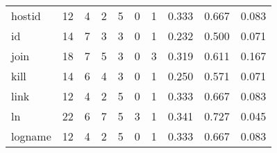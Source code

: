 \begin{longtable}{lp{1.3cm}p{1.3cm}p{1.3cm}p{1.3cm}p{1.3cm}p{1.3cm}p{1.3cm}p{1.3cm}p{1.3cm}}
hostid    &                     12 &                                             4 &                                            2 &                                           5 &                                            0 &                                          1 &                                0.333 &                                  0.667 &                                0.083 \\
id        &                     14 &                                             7 &                                            3 &                                           3 &                                            0 &                                          1 &                                0.232 &                                  0.500 &                                0.071 \\
join      &                     18 &                                             7 &                                            5 &                                           3 &                                            0 &                                          3 &                                0.319 &                                  0.611 &                                0.167 \\
kill      &                     14 &                                             6 &                                            4 &                                           3 &                                            0 &                                          1 &                                0.250 &                                  0.571 &                                0.071 \\
link      &                     12 &                                             4 &                                            2 &                                           5 &                                            0 &                                          1 &                                0.333 &                                  0.667 &                                0.083 \\
ln        &                     22 &                                             6 &                                            7 &                                           5 &                                            3 &                                          1 &                                0.341 &                                  0.727 &                                0.045 \\
logname   &                     12 &                                             4 &                                            2 &                                           5 &                                            0 &                                          1 &                                0.333 &                                  0.667 &                                0.083 \\

\end{longtable}
